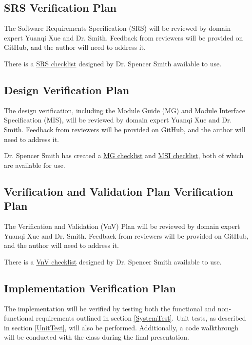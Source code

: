 \documentclass[12pt, titlepage]{article}
\begin{document}
\subsection{SRS Verification Plan}

The Software Requirements Specification (SRS) will be reviewed by domain expert Yuanqi Xue and Dr. Smith. Feedback from reviewers will be provided on GitHub, and the author will need to address it.

\noindent There is a \href{https://github.com/V-AS/Two-tower-recommender-system/blob/main/docs/Checklists/SRS-Checklist.pdf}{SRS checklist} designed by Dr. Spencer Smith available to use.

\subsection{Design Verification Plan}

The design verification, including the Module Guide (MG) and Module Interface Specification (MIS), will be reviewed by domain expert Yuanqi Xue and Dr. Smith. Feedback from reviewers will be provided on GitHub, and the author will need to address it.

\noindent Dr. Spencer Smith has created a \href{https://github.com/V-AS/Two-tower-recommender-system/blob/main/docs/Checklists/MG-Checklist.pdf}{MG checklist} and \href{https://github.com/V-AS/Two-tower-recommender-system/blob/main/docs/Checklists/MIS-Checklist.pdf}{MSI checklist}, both of which are available for use.

\subsection{Verification and Validation Plan Verification Plan}

The Verification and Validation (VnV) Plan will be reviewed by domain expert Yuanqi Xue and Dr. Smith. Feedback from reviewers will be provided on GitHub, and the author will need to address it.

\noindent  There is a \href{https://github.com/V-AS/Two-tower-recommender-system/blob/main/docs/Checklists/VnV-Checklist.pdf}{VnV checklist} designed by Dr. Spencer Smith available to use.
%

\subsection{Implementation Verification Plan}

The implementation will be verified by testing both the functional and non-functional requirements outlined in section \ref{SystemTest}. Unit tests, as described in section \ref{UnitTest}, will also be performed. Additionally, a code walkthrough will be conducted with the class during the final presentation.
\end{document}
